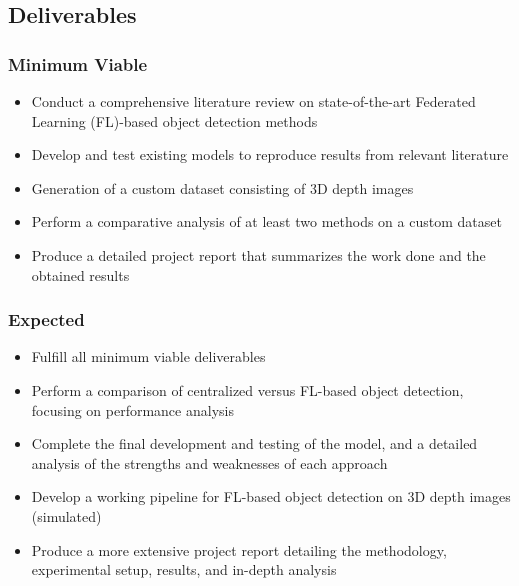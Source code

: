 \documentclass[thesis]{mas_proposal}
\begin{document}
\newpage
\subsection{Deliverables}
\subsubsection*{Minimum Viable}
\begin{itemize}
      \item Conduct a comprehensive literature review on state-of-the-art Federated Learning (FL)-based object detection methods
      \item Develop and test existing models to reproduce results from relevant literature
      \item Generation of a custom dataset consisting of 3D depth images
      \item Perform a comparative analysis of at least two methods on a custom dataset
      \item Produce a detailed project report that summarizes the work done and the obtained results

\end{itemize}

\subsubsection*{Expected}
\begin{itemize}
      \item Fulfill all minimum viable deliverables
      \item Perform a comparison of centralized versus FL-based object detection, focusing on performance analysis
      \item Complete the final development and testing of the model, and a detailed analysis of the strengths and weaknesses of each approach
      \item Develop a working pipeline for FL-based object detection on 3D depth images (simulated)
      \item Produce a more extensive project report detailing the methodology, experimental setup, results, and in-depth analysis

\end{itemize}
\end{document}
